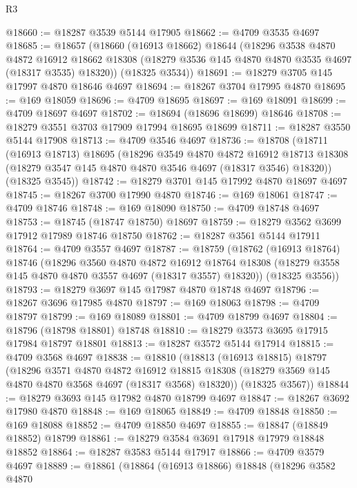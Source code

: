 \begin{lexlean}{R3}
\begin{coremodule}
@18660 := @18287 @3539 @5144 @17905
@18662 := @4709 @3535 @4697
@18685 := @18657
    (@18660
      (@16913 @18662)
      @18644
      (@18296
        @3538
        @4870
        @4872
        @16912
        @18662
        @18308
        (@18279 @3536 @145 @4870 @4870 @3535 @4697 (@18317 @3535) @18320))
      (@18325 @3534))
@18691 := @18279 @3705 @145 @17997 @4870 @18646 @4697
@18694 := @18267 @3704 @17995 @4870
@18695 := @169 @18059
@18696 := @4709 @18695
@18697 := @169 @18091
@18699 := @4709 @18697 @4697
@18702 := @18694 (@18696 @18699) @18646
@18708 := @18279 @3551 @3703 @17909 @17994 @18695 @18699
@18711 := @18287 @3550 @5144 @17908
@18713 := @4709 @3546 @4697
@18736 := @18708
    (@18711
      (@16913 @18713)
      @18695
      (@18296
        @3549
        @4870
        @4872
        @16912
        @18713
        @18308
        (@18279 @3547 @145 @4870 @4870 @3546 @4697 (@18317 @3546) @18320))
      (@18325 @3545))
@18742 := @18279 @3701 @145 @17992 @4870 @18697 @4697
@18745 := @18267 @3700 @17990 @4870
@18746 := @169 @18061
@18747 := @4709 @18746
@18748 := @169 @18090
@18750 := @4709 @18748 @4697
@18753 := @18745 (@18747 @18750) @18697
@18759 := @18279 @3562 @3699 @17912 @17989 @18746 @18750
@18762 := @18287 @3561 @5144 @17911
@18764 := @4709 @3557 @4697
@18787 := @18759
    (@18762
      (@16913 @18764)
      @18746
      (@18296
        @3560
        @4870
        @4872
        @16912
        @18764
        @18308
        (@18279 @3558 @145 @4870 @4870 @3557 @4697 (@18317 @3557) @18320))
      (@18325 @3556))
@18793 := @18279 @3697 @145 @17987 @4870 @18748 @4697
@18796 := @18267 @3696 @17985 @4870
@18797 := @169 @18063
@18798 := @4709 @18797
@18799 := @169 @18089
@18801 := @4709 @18799 @4697
@18804 := @18796 (@18798 @18801) @18748
@18810 := @18279 @3573 @3695 @17915 @17984 @18797 @18801
@18813 := @18287 @3572 @5144 @17914
@18815 := @4709 @3568 @4697
@18838 := @18810
    (@18813
      (@16913 @18815)
      @18797
      (@18296
        @3571
        @4870
        @4872
        @16912
        @18815
        @18308
        (@18279 @3569 @145 @4870 @4870 @3568 @4697 (@18317 @3568) @18320))
      (@18325 @3567))
@18844 := @18279 @3693 @145 @17982 @4870 @18799 @4697
@18847 := @18267 @3692 @17980 @4870
@18848 := @169 @18065
@18849 := @4709 @18848
@18850 := @169 @18088
@18852 := @4709 @18850 @4697
@18855 := @18847 (@18849 @18852) @18799
@18861 := @18279 @3584 @3691 @17918 @17979 @18848 @18852
@18864 := @18287 @3583 @5144 @17917
@18866 := @4709 @3579 @4697
@18889 := @18861
    (@18864
      (@16913 @18866)
      @18848
      (@18296
        @3582
        @4870

\end{coremodule}
\end{lexlean}
